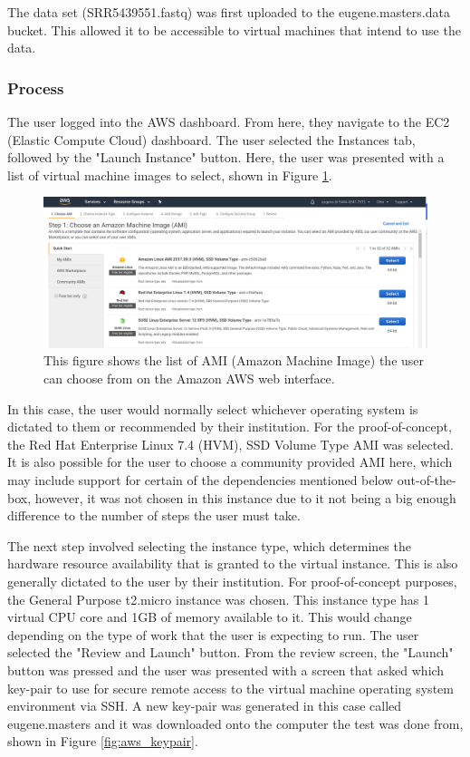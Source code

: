 The data set (SRR5439551.fastq) was first uploaded to the eugene.masters.data bucket. This allowed it to be accessible to virtual machines that intend to use the data.

\subsubsection{Process}

The user logged into the AWS dashboard. From here, they navigate to the EC2 (Elastic Compute Cloud) dashboard. The user selected the Instances tab, followed by the "Launch Instance" button. Here, the user was presented with a list of virtual machine images to select, shown in Figure \ref{fig:aws_ami}.

\begin{figure}[h!]
\centering
\includegraphics[width=\textwidth]{Figures/4_aws_select_instance.png}
\decoRule
\caption[List of Amazon Machine Images Available on AWS]{This figure shows the list of AMI (Amazon Machine Image) the user can choose from on the Amazon AWS web interface.}
\label{fig:aws_ami}
\end{figure}

In this case, the user would normally select whichever operating system is dictated to them or recommended by their institution. For the proof-of-concept, the Red Hat Enterprise Linux 7.4 (HVM), SSD Volume Type AMI was selected. It is also possible for the user to choose a community provided AMI here, which may include support for certain of the dependencies mentioned below out-of-the-box, however, it was not chosen in this instance due to it not being a big enough difference to the number of steps the user must take.

The next step involved selecting the instance type, which determines the hardware resource availability that is granted to the virtual instance. This is also generally dictated to the user by their institution. For proof-of-concept purposes, the General Purpose t2.micro instance was chosen. This instance type has 1 virtual CPU core and 1GB of memory available to it. This would change depending on the type of work that the user is expecting to run. The user selected the "Review and Launch" button. From the review screen, the "Launch" button was pressed and the user was presented with a screen that asked which key-pair to use for secure remote access to the virtual machine operating system environment via SSH. A new key-pair was generated in this case called eugene.masters and it was downloaded onto the computer the test was done from, shown in Figure \ref{fig:aws_keypair}.

